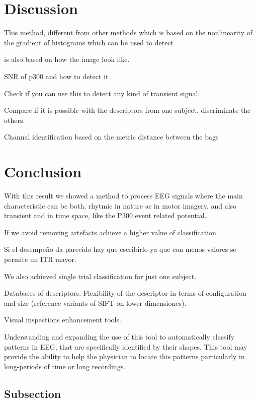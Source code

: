 \documentclass[entropy,article,submit,moreauthors,pdftex,10pt,a4paper]{mdpi}
\begin{document}
\section{Discussion}

This method, different from other methods which is based on the nonlinearity of the gradient of histograms which can be used to detect 

is also based on how the image look like.

SNR of p300 and how to detect it

Check if you can use this to detect any kind of transient signal.

Compare if it is possible with the descriptors from one subject, discriminate the others.

Channal identification based on the metric distance between the bags


\section{Conclusion}

With this result we showed a method to process EEG signals where the main characteristic can be both, rhytmic in nature as in motor imagery, and also transient and in time space, like the P300 event related potential.

If we avoid removing artefacts achieve a higher value of classification.

Si el desempeño da parecido hay que escribirlo ya que con menos valores se permite un ITR mayor.

We also achieved single trial classification for just one subject.

Databases of descriptors.  Flexibility of the descriptor in terms of configuration and size (reference variants of SIFT on lower dimensiones).

Visual inspections enhancement tools.

Understanding and expanding the use of this tool to automatically classify patterns in EEG, that are specifically identified by their shapes.  This tool may provide the ability to help the physician to locate this patterns particularly in long-periods of time or long recordings. 
\citep{Hartman2005}

\subsection{Subsection}
\end{document}
